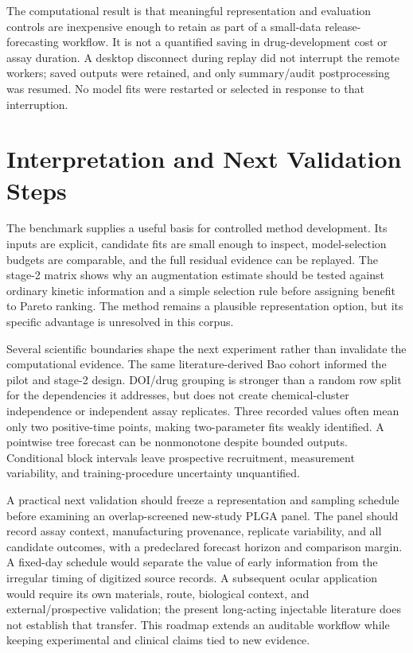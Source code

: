 \documentclass[conference,letterpaper]{IEEEtran}
\begin{document}
The computational result is that meaningful representation and evaluation controls are inexpensive enough to retain as part of a small-data release-forecasting workflow. It is not a quantified saving in drug-development cost or assay duration. A desktop disconnect during replay did not interrupt the remote workers; saved outputs were retained, and only summary/audit postprocessing was resumed. No model fits were restarted or selected in response to that interruption.

\section{Interpretation and Next Validation Steps}
The benchmark supplies a useful basis for controlled method development. Its inputs are explicit, candidate fits are small enough to inspect, model-selection budgets are comparable, and the full residual evidence can be replayed. The stage-2 matrix shows why an augmentation estimate should be tested against ordinary kinetic information and a simple selection rule before assigning benefit to Pareto ranking. The method remains a plausible representation option, but its specific advantage is unresolved in this corpus.

Several scientific boundaries shape the next experiment rather than invalidate the computational evidence. The same literature-derived Bao cohort informed the pilot and stage-2 design. DOI/drug grouping is stronger than a random row split for the dependencies it addresses, but does not create chemical-cluster independence or independent assay replicates. Three recorded values often mean only two positive-time points, making two-parameter fits weakly identified. A pointwise tree forecast can be nonmonotone despite bounded outputs. Conditional block intervals leave prospective recruitment, measurement variability, and training-procedure uncertainty unquantified.

A practical next validation should freeze a representation and sampling schedule before examining an overlap-screened new-study PLGA panel. The panel should record assay context, manufacturing provenance, replicate variability, and all candidate outcomes, with a predeclared forecast horizon and comparison margin. A fixed-day schedule would separate the value of early information from the irregular timing of digitized source records. A subsequent ocular application would require its own materials, route, biological context, and external/prospective validation; the present long-acting injectable literature does not establish that transfer. This roadmap extends an auditable workflow while keeping experimental and clinical claims tied to new evidence.
\end{document}
